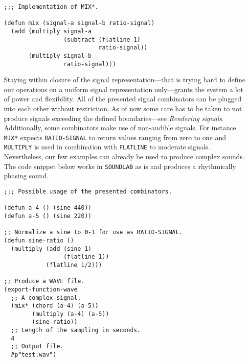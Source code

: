\begin{verbatim}
;;; Implementation of MIX*.

(defun mix (signal-a signal-b ratio-signal)
  (add (multiply signal-a
                 (subtract (flatline 1)
                           ratio-signal))
       (multiply signal-b
                 ratio-signal)))
\end{verbatim}

Staying within closure of the signal representation---that is trying
hard to define our operations on a uniform signal representation
only---grants the system a lot of power and flexibility. All of the
presented signal combinators can be plugged into each other without
restriction. As of now some care has to be taken to not produce signals
exceeding the defined boundaries---see \textit{Rendering signals}.
Additionally, some combinators make use of non-audible signals. For
instance \texttt{MIX*} expects \texttt{RATIO-SIGNAL} to return values
ranging from zero to one and \texttt{MULTIPLY} is used in combination
with \texttt{FLATLINE} to moderate signals. Nevertheless, our few
examples can already be used to produce complex sounds. The code snippet
below works in \texttt{SOUNDLAB} as is and produces a rhythmically phasing
sound.

\begin{verbatim}
;;; Possible usage of the presented combinators.

(defun a-4 () (sine 440))
(defun a-5 () (sine 220))

;; Normalize a sine to 0-1 for use as RATIO-SIGNAL.
(defun sine-ratio ()
  (multiply (add (sine 1)
                 (flatline 1))
            (flatline 1/2)))

;; Produce a WAVE file.
(export-function-wave
  ;; A complex signal.
  (mix* (chord (a-4) (a-5))
        (multiply (a-4) (a-5))
        (sine-ratio))
  ;; Length of the sampling in seconds.
  4
  ;; Output file.
  #p"test.wav")
\end{verbatim}
